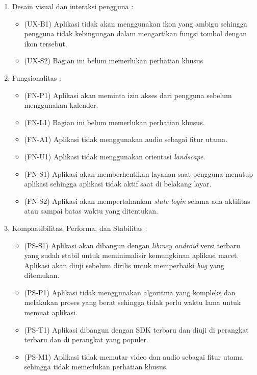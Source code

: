 \begin{enumerate}
    \item Desain visual dan interaksi pengguna : 
    \begin{itemize}
        \item (UX-B1) Aplikasi tidak akan menggunakan ikon yang ambigu sehingga pengguna tidak kebingungan dalam mengartikan fungsi tombol dengan ikon tersebut. 
        \item (UX-S2) Bagian ini belum memerlukan perhatian khusus %
    \end{itemize}
    \item Fungsionalitas : 
    \begin{itemize}
        \item (FN-P1) Aplikasi akan meminta izin akses dari pengguna sebelum menggunakan kalender.
        \item (FN-L1) Bagian ini belum memerlukan perhatian khusus.
        \item (FN-A1) Aplikasi tidak menggunakan audio sebagai fitur utama.
        \item (FN-U1) Aplikasi tidak menggunakan orientasi \textit{landscape}.
        \item (FN-S1) Aplikasi akan memberhentikan layanan saat pengguna menutup aplikasi sehingga aplikasi tidak aktif saat di belakang layar.
        \item (FN-S2) Aplikasi akan mempertahankan \textit{state login} selama ada aktifitas atau sampai batas waktu yang ditentukan. 
    \end{itemize}
    \item Kompaatibilitas, Performa, dan Stabilitas : 
    \begin{itemize}
        \item (PS-S1) Aplikasi akan dibangun dengan \textit{library android} versi terbaru yang sudah stabil untuk meminimalisir kemungkinan aplikasi macet. Aplikasi akan diuji sebelum dirilis untuk memperbaiki \textit{bug} yang ditemukan.
        \item (PS-P1) Aplikasi tidak menggunakan algoritma yang kompleks dan melakukan proses yang berat sehingga tidak perlu waktu lama untuk memuat aplikasi.
        \item (PS-T1) Aplikasi dibangun dengan SDK terbaru dan diuji di perangkat terbaru dan di perangkat yang populer.
        \item (PS-M1) Aplikasi tidak memutar video dan audio sebagai fitur utama sehingga tidak memerlukan perhatian khusus.

\end{itemize}
\end{enumerate}
